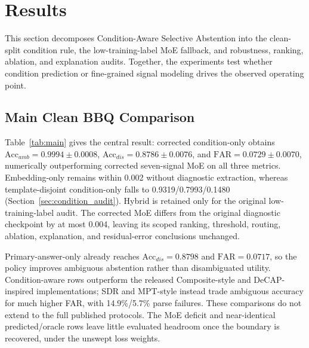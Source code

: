 \documentclass{ieeeaccess}
\newcommand{\method}{Condition-Aware Selective Abstention}
\newcommand{\accamb}{\mathrm{Acc}_{amb}}
\newcommand{\accdis}{\mathrm{Acc}_{dis}}
\newcommand{\far}{\mathrm{FAR}}
\begin{document}
\section{Results}
\label{sec:results}

This section decomposes \method{} into the clean-split condition rule, the low-training-label MoE fallback, and robustness, ranking, ablation, and explanation audits. Together, the experiments test whether condition prediction or fine-grained signal modeling drives the observed operating point.

\subsection{Main Clean BBQ Comparison}
Table~\ref{tab:main} gives the central result: corrected condition-only obtains $\accamb=0.9994\pm0.0008$, $\accdis=0.8786\pm0.0076$, and $\far=0.0729\pm0.0070$, numerically outperforming corrected seven-signal MoE on all three metrics. Embedding-only remains within 0.002 without diagnostic extraction, whereas template-disjoint condition-only falls to 0.9319/0.7993/0.1480 (Section~\ref{sec:condition_audit}). Hybrid is retained only for the original low-training-label audit. The corrected MoE differs from the original diagnostic checkpoint by at most 0.004, leaving its scoped ranking, threshold, routing, ablation, explanation, and residual-error conclusions unchanged.

Primary-answer-only already reaches $\accdis=0.8798$ and $\far=0.0717$, so the policy improves ambiguous abstention rather than disambiguated utility. Condition-aware rows outperform the released Composite-style and DeCAP-inspired implementations; SDR and MPT-style instead trade ambiguous accuracy for much higher FAR, with 14.9\%/5.7\% parse failures. These comparisons do not extend to the full published protocols. The MoE deficit and near-identical predicted/oracle rows leave little evaluated headroom once the boundary is recovered, under the unswept loss weights.
\end{document}

